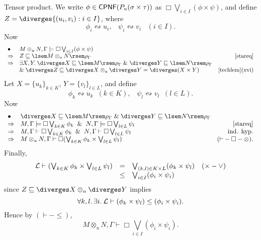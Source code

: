 Tensor product.
We write $\phi \in {\sf CPNF}(P_{u}(\sigma \times \tau ))$ as $\Box \bigvee_{i \in I}(\phi \times \psi )$, and define $Z = \diverges \{ (u_{i}, v_{i}) : i \in I \}$, where
\[ \phi_{i} \leftrightsquigarrow u_{i}, \;\;\; \psi_{i} \leftrightsquigarrow v_{i} \;\;\; (i \in I). \]
Now
\[ \begin{array}{llr}
\bullet & M \otimes_{u} N, \Gamma \models \Box \bigvee_{i \in I}(\phi \times \psi ) & \\
\Rightarrow & Z \sqsubseteq \lsem M \otimes_{u} N \rsem \rho_{\Gamma} & \ref{stareq} \\
\Rightarrow & \exists X, Y. \: \diverges X \sqsubseteq \lsem M \rsem \rho_{\Gamma} \; \& \; \diverges Y \sqsubseteq \lsem N \rsem \rho_{\Gamma} & \\
& \& \; \diverges Z \sqsubseteq \diverges X \otimes_{u} \diverges Y = \diverges (X \times Y) & \mbox{\ref{techlem}(xvi)} 
\end{array} \]
Let $X = \{ u_{k} \}_{k \in K}$, $Y = \{ v_{l} \}_{l \in L}$, and define
\[ \phi_{k} \leftrightsquigarrow u_{k} \;\; (k \in K), \;\;\; \psi_{l} \leftrightsquigarrow v_{l} \;\; (l \in L). \]
Now
\[ \begin{array}{llr}
\bullet & \diverges X \sqsubseteq \lsem M \rsem \rho_{\Gamma} \; \& \; \diverges Y \sqsubseteq \lsem N \rsem \rho_{\Gamma} &  \\
\Rightarrow & M, \Gamma \models \Box \bigvee_{k \in K} \phi_{k} \;\; \& \;\; N, \Gamma \models \Box \bigvee_{l \in L} \psi_{l} & \ref{stareq} \\
\Rightarrow & M, \Gamma \vdash \Box \bigvee_{k \in K} \phi_{k} \;\; \& \;\; N, \Gamma \vdash \Box \bigvee_{l \in L} \psi_{l} & \mbox{ind. hyp.} \\
\Rightarrow & M \otimes_{u} N, \Gamma \vdash \Box ( \bigvee_{k \in K} \phi_{k} \times \bigvee_{l \in L} \psi_{l}) & ({\vdash}-{\Box}-{\otimes}).
\end{array} \]
Finally,
\[ \begin{array}{rclr}
{\cal L} \vdash ( \bigvee_{k \in K} \phi_{k} \times \bigvee_{l \in L} \psi_{l}) & = & \bigvee_{(k,l) \in K \times L} (\phi_{k} \times \psi_{l}) & ({\times}-{\vee}) \\
& \leq & \bigvee_{i \in I} (\phi_{i} \times \psi_{i}) &
\end{array} \]
since $Z \sqsubseteq \diverges X \otimes_{u} \diverges Y$ implies
\[ \forall k, l. \, \exists i. \: {\cal L} \vdash (\phi_{k} \times \psi_{l}) \leq (\phi_{i} \times \psi_{i}). \]
Hence by $({\vdash}-{\leq})$,
\[ M \otimes_{u} N, \Gamma \vdash \Box  \bigvee_{i \in I} (\phi_{i} \times \psi_{i}). \]

